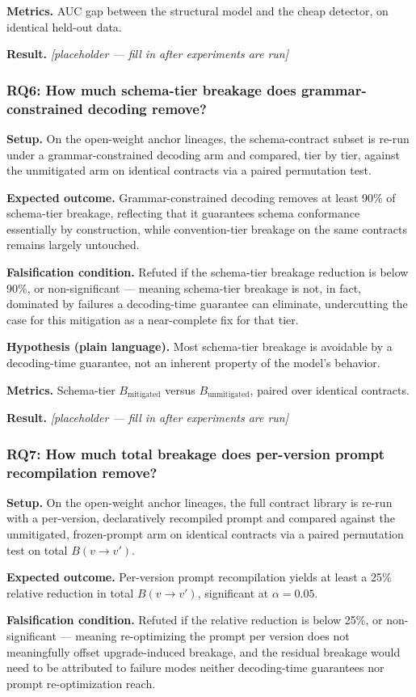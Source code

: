 \documentclass[11pt]{article}
\newcommand{\ph}{\textit{[placeholder --- fill in after experiments are run]}}
\begin{document}
\textbf{Metrics.} AUC gap between the structural model and the cheap detector, on identical held-out data.

\textbf{Result.} \ph

\subsubsection{RQ6: How much schema-tier breakage does grammar-constrained decoding remove?}
\textbf{Setup.} On the open-weight anchor lineages, the schema-contract subset is re-run under a grammar-constrained decoding arm and compared, tier by tier, against the unmitigated arm on identical contracts via a paired permutation test.

\textbf{Expected outcome.} Grammar-constrained decoding removes at least 90\% of schema-tier breakage, reflecting that it guarantees schema conformance essentially by construction, while convention-tier breakage on the same contracts remains largely untouched.

\textbf{Falsification condition.} Refuted if the schema-tier breakage reduction is below 90\%, or non-significant --- meaning schema-tier breakage is not, in fact, dominated by failures a decoding-time guarantee can eliminate, undercutting the case for this mitigation as a near-complete fix for that tier.

\textbf{Hypothesis (plain language).} Most schema-tier breakage is avoidable by a decoding-time guarantee, not an inherent property of the model's behavior.

\textbf{Metrics.} Schema-tier $B_{\text{mitigated}}$ versus $B_{\text{unmitigated}}$, paired over identical contracts.

\textbf{Result.} \ph

\subsubsection{RQ7: How much total breakage does per-version prompt recompilation remove?}
\textbf{Setup.} On the open-weight anchor lineages, the full contract library is re-run with a per-version, declaratively recompiled prompt and compared against the unmitigated, frozen-prompt arm on identical contracts via a paired permutation test on total $B(v{\to}v')$.

\textbf{Expected outcome.} Per-version prompt recompilation yields at least a 25\% relative reduction in total $B(v{\to}v')$, significant at $\alpha = 0.05$.

\textbf{Falsification condition.} Refuted if the relative reduction is below 25\%, or non-significant --- meaning re-optimizing the prompt per version does not meaningfully offset upgrade-induced breakage, and the residual breakage would need to be attributed to failure modes neither decoding-time guarantees nor prompt re-optimization reach.
\end{document}
